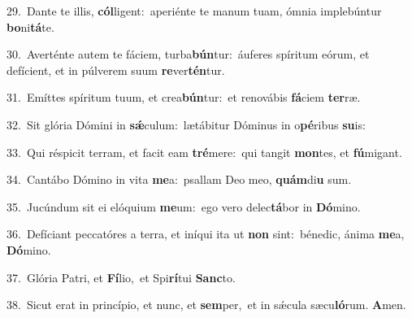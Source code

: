 {\numbfont\textcolor{\numbcolor}{29.}}~Dante te illis, \textbf{cól}\-ligent:~\star aperiénte te manum tuam, ómnia implebúntur \textbf{bo}\-ni\-\textbf{tá}\-te.\par
{\numbfont\textcolor{\numbcolor}{30.}}~Averténte autem te fáciem, turba\-\textbf{bún}\-tur:~\star áuferes spíritum eórum, et defícient, et in púlverem suum \textbf{re}\-ver\-\textbf{tén}\-tur.\par
{\numbfont\textcolor{\numbcolor}{31.}}~Emíttes spíritum tuum, et crea\-\textbf{bún}\-tur:~\star et renovábis \textbf{fá}\-ciem \textbf{ter}\-ræ.\par
{\numbfont\textcolor{\numbcolor}{32.}}~Sit glória Dómini in \textbf{sǽ}\-culum:~\star lætábitur Dóminus in o\-\textbf{pé}\-ribus \textbf{su}\-is:\par
{\numbfont\textcolor{\numbcolor}{33.}}~Qui réspicit terram, et facit eam \textbf{tré}\-mere:~\star qui tangit \textbf{mon}\-tes, et \textbf{fú}\-migant.\par
{\numbfont\textcolor{\numbcolor}{34.}}~Cantábo Dómino in vita \textbf{me}\-a:~\star psallam Deo meo, \textbf{quám}\-di\textbf{u} sum.\par
{\numbfont\textcolor{\numbcolor}{35.}}~Jucúndum sit ei elóquium \textbf{me}\-um:~\star ego vero delec\-\textbf{tá}\-bor in \textbf{Dó}\-mino.\par
{\numbfont\textcolor{\numbcolor}{36.}}~Defíciant peccatóres a terra, et iníqui ita ut \textbf{non} sint:~\star bénedic, ánima \textbf{me}\-a, \textbf{Dó}\-mino.\par
{\numbfont\textcolor{\numbcolor}{37.}}~Glória Patri, et \textbf{Fí}\-lio,~\star et Spi\-\textbf{rí}\-tui \textbf{Sanc}\-to.\par
{\numbfont\textcolor{\numbcolor}{38.}}~Sicut erat in princípio, et nunc, et \textbf{sem}\-per,~\star et in sǽcula sæcu\-\textbf{ló}\-rum. \textbf{A}\-men.\par
